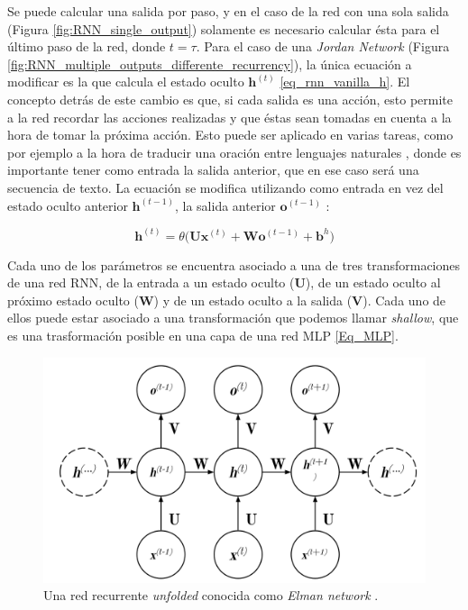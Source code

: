 \documentclass[spanish]{article}
\theoremstyle{definition}
\theoremstyle{remark}
\numberwithin{equation}{section}
\numberwithin{equation}{section} %
\begin{document}
 \par 
 Se puede calcular una salida por paso, y en el caso de la red con una sola salida (Figura \ref{fig:RNN_single_output}) solamente es necesario calcular ésta para el último paso de la red, donde $t=\tau$. Para el caso de una \textit{Jordan Network} (Figura \ref{fig:RNN_multiple_outputs_differente_recurrency}), la única ecuación a modificar es la que calcula el estado oculto $\boldsymbol{h}^{(t)}$ \eqref{eq_rnn_vanilla_h}. El concepto detrás de este cambio es que, si cada salida es una acción, esto permite a la red recordar las acciones realizadas y que éstas sean tomadas en cuenta a la hora de tomar la próxima acción. Esto puede ser aplicado en varias tareas, como por ejemplo a la hora de traducir una oración entre lenguajes naturales \cite{sutskever2014sequence}, donde es importante tener como entrada la salida anterior, que en ese caso será una secuencia de texto. La ecuación se modifica utilizando como entrada en vez del estado oculto anterior $\boldsymbol{h}^{(t-1)}$, la salida anterior $\boldsymbol{o}^{(t-1)}$ : \par
 \begin{equation}
\label{eq_jordan_rnn_vanilla_h}
\boldsymbol{h}^{(t)}=\theta\Big(\boldsymbol{U}\boldsymbol{x}^{(t)}+\boldsymbol{W}\boldsymbol{o}^{(t-1)} + \boldsymbol{b}^h\Big)
\end{equation} \par
 Cada uno de los parámetros se encuentra asociado a una de tres transformaciones de una red RNN, de la entrada a un estado oculto ($\boldsymbol{U}$), de un estado oculto al próximo estado oculto ($\boldsymbol{W}$) y de un estado oculto a la salida ($\boldsymbol{V}$). Cada uno de ellos puede estar asociado a una transformación que podemos llamar \textit{shallow}, que es una trasformación posible en una capa de una red MLP \eqref{Eq_MLP}.
\begin{figure}[H]
 \centering
 \includegraphics[width=13cm]{img/RNN_Schema_Multiple_Output.png}
\caption[Diagrama RNN  \textit{Elman network}]{\footnotesize{ Una red recurrente \cite{goodfellow2016deep} \textit{unfolded} conocida como \textit{Elman network} \cite{elman1990finding}.  }}
\label{fig:RNN_multiple_outputs}
\end{figure}
\end{document}
